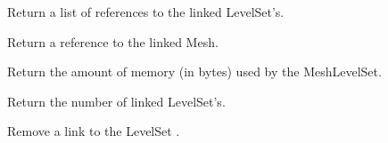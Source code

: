 \documentclass[a4paper,11pt,english]{sphinxmanual}
\begin{document}
\begin{fulllineitems}
\begin{fulllineitems}
\label{\detokenize{python/cmdref_MeshLevelSet:getfem.MeshLevelSet.levelsets}}
Return a list of references to the linked LevelSet’s.

\end{fulllineitems}


\begin{fulllineitems}
\label{\detokenize{python/cmdref_MeshLevelSet:getfem.MeshLevelSet.linked_mesh}}
Return a reference to the linked Mesh.

\end{fulllineitems}


\begin{fulllineitems}
\label{\detokenize{python/cmdref_MeshLevelSet:getfem.MeshLevelSet.memsize}}
Return the amount of memory (in bytes) used by the MeshLevelSet.

\end{fulllineitems}


\begin{fulllineitems}
\label{\detokenize{python/cmdref_MeshLevelSet:getfem.MeshLevelSet.nb_ls}}
Return the number of linked LevelSet’s.

\end{fulllineitems}


\begin{fulllineitems}
\label{\detokenize{python/cmdref_MeshLevelSet:getfem.MeshLevelSet.sup}}
Remove a link to the LevelSet .

\end{fulllineitems}


\end{fulllineitems}
\end{document}
